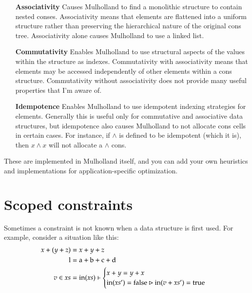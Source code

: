 \documentclass{report}
\def\rewrite {\vdash}
\begin{document}
\begin{enumerate}
\item[\bf Associativity]
  Causes Mulholland to find a monolithic structure to contain nested conses. Associativity means that elements are flattened into a uniform structure rather than preserving the
  hierarchical nature of the original cons tree. Associativity alone causes Mulholland to use a linked list.

\item[\bf Commutativity]
  Enables Mulholland to use structural aspects of the values within the structure as indexes. Commutativity with associativity means that elements may be accessed independently of other
  elements within a cons structure. Commutativity without associativity does not provide many useful properties that I'm aware of.

\item[\bf Idempotence]
  Enables Mulholland to use idempotent indexing strategies for elements. Generally this is useful only for commutative and associative data structures, but idempotence also causes
  Mulholland to not allocate cons cells in certain cases. For instance, if $\wedge$ is defined to be idempotent (which it is), then $x \wedge x$ will not allocate a $\wedge$ cons.
\end{enumerate}

    These are implemented in Mulholland itself, and you can add your own heuristics and implementations for application-specific optimization.

\section{Scoped constraints}
    Sometimes a constraint is not known when a data structure is first used. For example, consider a situation like this:
\begin{align*}
x + (y + z) & = x + y + z \\
\textrm l   & = \textrm a + \textrm b + \textrm c + \textrm d \\
v \in xs    & = \textrm{in}(xs) \rewrite \begin{cases}
                                           x + y = y + x \\
                                           \textrm{in}(xs') = \textrm{false} \rhd \textrm{in}(v + xs') = \textrm{true}
                                         \end{cases}
\end{align*}
\end{document}
